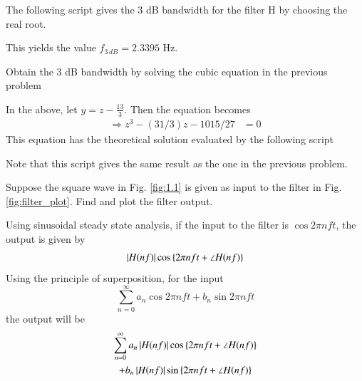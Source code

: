 %
The following script gives the 3 dB bandwidth for the filter H by choosing the 
real root.
%

%
This yields the value $f_{3\, dB} = 2.3395$ Hz.
\begin{problem}
Obtain the 3 dB bandwidth by solving the cubic equation in the previous problem
\end{problem}
%
\solution In the above, let $y = z - \frac{13}{3}$.  Then the equation becomes
\begin{align}
\Rightarrow z^3 - (31/3)z  -1015/27  & = 0
\end{align}
This equation has the theoretical solution evaluated by the following script
%

Note that this script gives the same result as the one in the previous problem.
%
\begin{problem}
Suppose the square wave in Fig. \ref{fig:1.1} is given as input to the filter in Fig. \ref{fig:filter_plot}.  Find and plot the filter output.
\end{problem}
%
\solution  Using sinusoidal steady state analysis, if the input to the filter is
%
$\cos{2\pi n f t}$, the output is given by
\begin{equation}
\left\vert H(nf)\right\vert\cos\left\{2\pi n f t + \angle H(nf)\right\}
\end{equation}
%
Using the principle of superposition, for the input 
%
\begin{equation}
\sum_{n=0}^{\infty}a_n\cos 2\pi n f t + b_n \sin 2 \pi n f t
\end{equation}
%
the output will be
%
%
\begin{multline}
\sum_{n=0}^{\infty}a_n\left\vert H(nf)\right\vert\cos\left\{2\pi n f t + \angle H(nf)\right\} 
\\
+ b_n \left\vert H(nf)\right\vert\sin\left\{2\pi n f t + \angle H(nf)\right\}
\end{multline}
